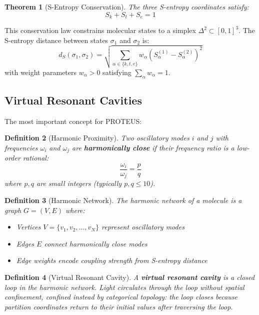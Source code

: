 \documentclass[11pt,a4paper]{article}
\newtheorem{theorem}{Theorem}[section]
\newtheorem{definition}[theorem]{Definition}
\begin{document}
\begin{theorem}[S-Entropy Conservation]
The three S-entropy coordinates satisfy:
\begin{equation}
S_k + S_t + S_e = 1
\end{equation}
\end{theorem}

This conservation law constrains molecular states to a simplex $\Delta^2 \subset [0,1]^3$. The S-entropy distance between states $\sigma_1$ and $\sigma_2$ is:
\begin{equation}
d_S(\sigma_1, \sigma_2) = \sqrt{\sum_{\alpha \in \{k,t,e\}} w_\alpha (S_\alpha^{(1)} - S_\alpha^{(2)})^2}
\end{equation}
with weight parameters $w_\alpha > 0$ satisfying $\sum_\alpha w_\alpha = 1$.

\subsection{Virtual Resonant Cavities}

The most important concept for PROTEUS:

\begin{definition}[Harmonic Proximity]
Two oscillatory modes $i$ and $j$ with frequencies $\omega_i$ and $\omega_j$ are \textbf{harmonically close} if their frequency ratio is a low-order rational:
\begin{equation}
\frac{\omega_i}{\omega_j} = \frac{p}{q}
\end{equation}
where $p, q$ are small integers (typically $p, q \leq 10$).
\end{definition}

\begin{definition}[Harmonic Network]
The harmonic network of a molecule is a graph $G = (V, E)$ where:
\begin{itemize}
\item Vertices $V = \{v_1, v_2, \ldots, v_N\}$ represent oscillatory modes
\item Edges $E$ connect harmonically close modes
\item Edge weights encode coupling strength from S-entropy distance
\end{itemize}
\end{definition}

\begin{definition}[Virtual Resonant Cavity]
A \textbf{virtual resonant cavity} is a closed loop in the harmonic network. Light circulates through the loop without spatial confinement, confined instead by categorical topology: the loop closes because partition coordinates return to their initial values after traversing the loop.
\end{definition}
\end{document}

